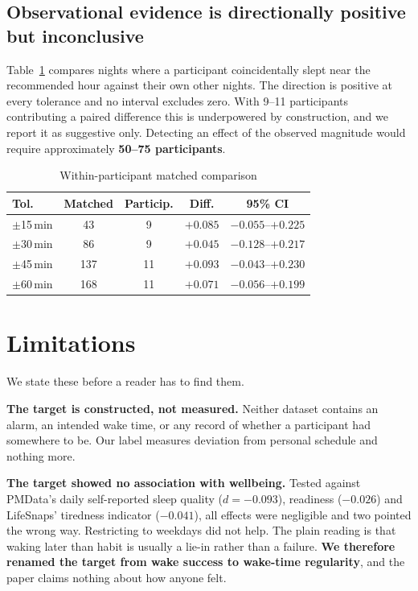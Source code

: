 \documentclass[conference]{IEEEtran}
\begin{document}
\subsection{Observational evidence is directionally positive but inconclusive}

Table~\ref{tab:matched} compares nights where a participant coincidentally slept
near the recommended hour against their own other nights. The direction is
positive at every tolerance and no interval excludes zero. With 9--11
participants contributing a paired difference this is underpowered by
construction, and we report it as suggestive only. Detecting an effect of the
observed magnitude would require approximately \textbf{50--75 participants}.

\begin{table}[t]
\caption{Within-participant matched comparison}
\label{tab:matched}
\centering
\small
\begin{tabular}{lcccc}
\toprule
Tol. & Matched & Particip. & Diff. & 95\% CI \\
\midrule
$\pm$15\,min & 43 & 9 & $+0.085$ & $-0.055$--$+0.225$ \\
$\pm$30\,min & 86 & 9 & $+0.045$ & $-0.128$--$+0.217$ \\
$\pm$45\,min & 137 & 11 & $+0.093$ & $-0.043$--$+0.230$ \\
$\pm$60\,min & 168 & 11 & $+0.071$ & $-0.056$--$+0.199$ \\
\bottomrule
\end{tabular}
\end{table}

\section{Limitations}
\label{sec:limitations}

We state these before a reader has to find them.

\textbf{The target is constructed, not measured.} Neither dataset contains an
alarm, an intended wake time, or any record of whether a participant had
somewhere to be. Our label measures deviation from personal schedule and nothing
more.

\textbf{The target showed no association with wellbeing.} Tested against
PMData's daily self-reported sleep quality ($d = -0.093$), readiness ($-0.026$)
and LifeSnaps' tiredness indicator ($-0.041$), all effects were negligible and
two pointed the wrong way. Restricting to weekdays did not help. The plain
reading is that waking later than habit is usually a lie-in rather than a
failure. \textbf{We therefore renamed the target from wake success to wake-time
regularity}, and the paper claims nothing about how anyone felt.
\end{document}
